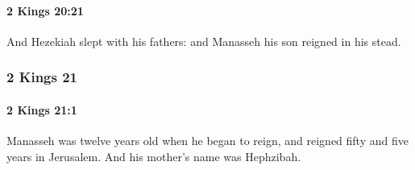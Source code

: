 		\paragraph{2 Kings 20:21} %
			\label{2KINGS-20-21}

			And Hezekiah slept with his fathers: and Manasseh his son reigned in his stead.

	\subsubsection{2 Kings 21} %
		\label{2KINGS-21}

		\paragraph{2 Kings 21:1} %
			\label{2KINGS-21-1}

			Manasseh was twelve years old when he began to reign, and reigned fifty and five years in Jerusalem. And his mother’s name was Hephzibah.

